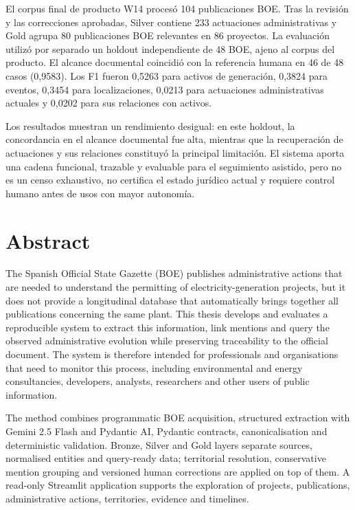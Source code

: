 El corpus final de producto W14 procesó 104 publicaciones BOE. Tras la revisión
y las correcciones aprobadas, Silver contiene 233 actuaciones administrativas
y Gold agrupa 80 publicaciones BOE relevantes en 86 proyectos. La evaluación
utilizó por separado un holdout independiente de 48 BOE, ajeno al corpus del
producto. El alcance documental coincidió con la referencia humana en 46 de 48
casos (0,9583). Los F1 fueron 0,5263 para activos de generación, 0,3824 para
eventos, 0,3454 para localizaciones, 0,0213 para actuaciones administrativas
actuales y 0,0202 para sus relaciones con activos.

Los resultados muestran un rendimiento desigual: en este holdout, la
concordancia en el alcance documental fue alta, mientras que la recuperación de
actuaciones y sus relaciones constituyó la principal limitación. El sistema
aporta una cadena funcional, trazable y evaluable para el seguimiento asistido,
pero no es un censo exhaustivo, no certifica el estado jurídico actual y
requiere control humano antes de usos con mayor autonomía.

\chapter*{Abstract}
The Spanish Official State Gazette (BOE) publishes administrative actions that
are needed to understand the permitting of electricity-generation projects,
but it does not provide a longitudinal database that automatically brings
together all publications concerning the same plant. This thesis develops and
evaluates a reproducible system to extract this information, link mentions and
query the observed administrative evolution while preserving traceability to
the official document. The system is therefore intended for professionals and
organisations that need to monitor this process, including environmental and
energy consultancies, developers, analysts, researchers and other users of
public information.

The method combines programmatic BOE acquisition, structured extraction with
Gemini 2.5 Flash and Pydantic AI, Pydantic contracts, canonicalisation and
deterministic validation. Bronze, Silver and Gold layers separate sources,
normalised entities and query-ready data; territorial resolution, conservative
mention grouping and versioned human corrections are applied on top of them. A
read-only Streamlit application supports the exploration of projects,
publications, administrative actions, territories, evidence and timelines.

